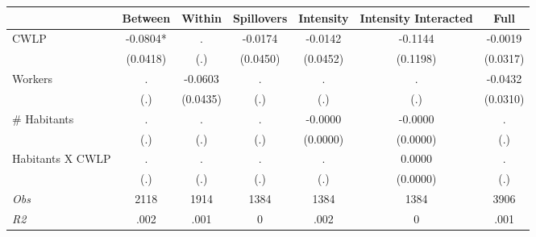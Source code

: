 \begin{tabular}{l*{6}{c}}\hline&\multicolumn{1}{c}{Between}&\multicolumn{1}{c}{Within}&\multicolumn{1}{c}{Spillovers}&\multicolumn{1}{c}{Intensity}&\multicolumn{1}{c}{Intensity Interacted}&\multicolumn{1}{c}{Full}\\ \hline 
CWLP & -0.0804* & . & -0.0174 & -0.0142 & -0.1144 & -0.0019 \\
 & (0.0418) & (.) & (0.0450) & (0.0452) & (0.1198) & (0.0317) \\
Workers & . & -0.0603 & . & . & . & -0.0432 \\
 & (.) & (0.0435) & (.) & (.) & (.) & (0.0310) \\
\# Habitants & . & . & . & -0.0000 & -0.0000 & . \\
 & (.) & (.) & (.) & (0.0000) & (0.0000) & (.) \\
Habitants X CWLP & . & . & . & . & 0.0000 & . \\
 & (.) & (.) & (.) & (.) & (0.0000) & (.) \\
\hline \textit{Obs} & 2118 & 1914 & 1384 & 1384 & 1384 & 3906 \\ \textit{R2} & .002 & .001 & 0 & .002 & 0 & .001 \\ \hline \end{tabular}
